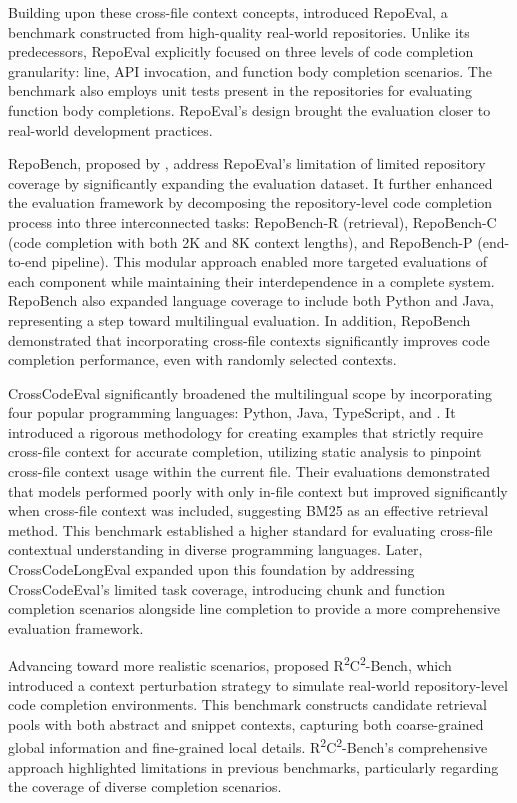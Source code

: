 Building upon these cross-file context concepts, \citet{zhang2023} introduced RepoEval, a benchmark constructed from high-quality real-world repositories. Unlike its predecessors, RepoEval explicitly focused on three levels of code completion granularity: line, API invocation, and function body completion scenarios. The benchmark also employs unit tests present in the repositories for evaluating function body completions. RepoEval's design brought the evaluation closer to real-world development practices.

RepoBench, proposed by \citet{liu2023}, address RepoEval's limitation of limited repository coverage by significantly expanding the evaluation dataset. It further enhanced the evaluation framework by decomposing the repository-level code completion process into three interconnected tasks: RepoBench-R (retrieval), RepoBench-C (code completion with both 2K and 8K context lengths), and RepoBench-P (end-to-end pipeline). This modular approach enabled more targeted evaluations of each component while maintaining their interdependence in a complete system. RepoBench also expanded language coverage to include both Python and Java, representing a step toward multilingual evaluation. In addition, RepoBench demonstrated that incorporating cross-file contexts significantly improves code completion performance, even with randomly selected contexts.

CrossCodeEval \parencite{ding2023} significantly broadened the multilingual scope by incorporating four popular programming languages: Python, Java, TypeScript, and \Csh. It introduced a rigorous methodology for creating examples that strictly require cross-file context for accurate completion, utilizing static analysis to pinpoint cross-file context usage within the current file. Their evaluations demonstrated that models performed poorly with only in-file context but improved significantly when cross-file context was included, suggesting BM25 \parencite{robertson2009} as an effective retrieval method. This benchmark established a higher standard for evaluating cross-file contextual understanding in diverse programming languages. Later, CrossCodeLongEval \parencite{wu2024a} expanded upon this foundation by addressing CrossCodeEval's limited task coverage, introducing chunk and function completion scenarios alongside line completion to provide a more comprehensive evaluation framework.

Advancing toward more realistic scenarios, \citet{deng2024} proposed R\textsuperscript{2}C\textsuperscript{2}-Bench, which introduced a context perturbation strategy to simulate real-world repository-level code completion environments. This benchmark constructs candidate retrieval pools with both abstract and snippet contexts, capturing both coarse-grained global information and fine-grained local details. R\textsuperscript{2}C\textsuperscript{2}-Bench's comprehensive approach highlighted limitations in previous benchmarks, particularly regarding the coverage of diverse completion scenarios.


